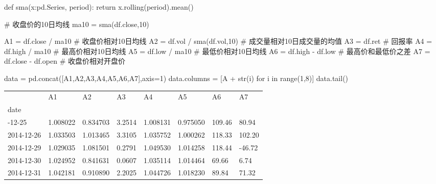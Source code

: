 \documentclass[
  letterpaper,
  DIV=11,
  numbers=noendperiod]{scrreprt}
\newenvironment{Shaded}{\begin{snugshade}}{\end{snugshade}}
\newcommand{\BuiltInTok}[1]{\textcolor[rgb]{0.00,0.23,0.31}{#1}}
\newcommand{\CommentTok}[1]{\textcolor[rgb]{0.37,0.37,0.37}{#1}}
\newcommand{\ControlFlowTok}[1]{\textcolor[rgb]{0.00,0.23,0.31}{#1}}
\newcommand{\DecValTok}[1]{\textcolor[rgb]{0.68,0.00,0.00}{#1}}
\newcommand{\KeywordTok}[1]{\textcolor[rgb]{0.00,0.23,0.31}{#1}}
\newcommand{\NormalTok}[1]{\textcolor[rgb]{0.00,0.23,0.31}{#1}}
\newcommand{\OperatorTok}[1]{\textcolor[rgb]{0.37,0.37,0.37}{#1}}
\newcommand{\StringTok}[1]{\textcolor[rgb]{0.13,0.47,0.30}{#1}}
\begin{document}
\begin{Shaded}
\begin{Highlighting}[]
\KeywordTok{def}\NormalTok{ sma(x:pd.Series, period):}
    \ControlFlowTok{return}\NormalTok{ x.rolling(period).mean()}

\CommentTok{\# 收盘价的10日均线}
\NormalTok{ma10 }\OperatorTok{=}\NormalTok{ sma(df.close,}\DecValTok{10}\NormalTok{) }

\NormalTok{A1 }\OperatorTok{=}\NormalTok{ df.close }\OperatorTok{/}\NormalTok{ ma10 }\CommentTok{\# 收盘价相对10日均线}
\NormalTok{A2 }\OperatorTok{=}\NormalTok{ df.vol }\OperatorTok{/}\NormalTok{ sma(df.vol,}\DecValTok{10}\NormalTok{) }\CommentTok{\# 成交量相对10日成交量的均值}
\NormalTok{A3 }\OperatorTok{=}\NormalTok{ df.ret }\CommentTok{\# 回报率}
\NormalTok{A4 }\OperatorTok{=}\NormalTok{ df.high }\OperatorTok{/}\NormalTok{ ma10 }\CommentTok{\# 最高价相对10日均线}
\NormalTok{A5 }\OperatorTok{=}\NormalTok{ df.low }\OperatorTok{/}\NormalTok{ ma10 }\CommentTok{\# 最低价相对10日均线}
\NormalTok{A6 }\OperatorTok{=}\NormalTok{ df.high }\OperatorTok{{-}}\NormalTok{ df.low }\CommentTok{\# 最高价和最低价之差}
\NormalTok{A7 }\OperatorTok{=}\NormalTok{ df.close }\OperatorTok{{-}}\NormalTok{ df.}\BuiltInTok{open} \CommentTok{\# 收盘价相对开盘价}

\NormalTok{data }\OperatorTok{=}\NormalTok{ pd.concat([A1,A2,A3,A4,A5,A6,A7],axis}\OperatorTok{=}\DecValTok{1}\NormalTok{)}
\NormalTok{data.columns }\OperatorTok{=}\NormalTok{ [}\StringTok{\textquotesingle{}A\textquotesingle{}} \OperatorTok{+} \BuiltInTok{str}\NormalTok{(i) }\ControlFlowTok{for}\NormalTok{ i }\KeywordTok{in} \BuiltInTok{range}\NormalTok{(}\DecValTok{1}\NormalTok{,}\DecValTok{8}\NormalTok{)]}
\NormalTok{data.tail()}
\end{Highlighting}
\end{Shaded}

\begin{longtable}[]{@{}llllllll@{}}
\toprule\noalign{}
& A1 & A2 & A3 & A4 & A5 & A6 & A7 \\
date & & & & & & & \\
\midrule\noalign{}
\endhead
\bottomrule\noalign{}
\endlastfoot
2014-12-25 & 1.008022 & 0.834703 & 3.2514 & 1.008131 & 0.975050 & 109.46
& 80.94 \\
2014-12-26 & 1.033503 & 1.013465 & 3.3105 & 1.035752 & 1.000262 & 118.33
& 102.20 \\
2014-12-29 & 1.029035 & 1.081501 & 0.2791 & 1.049530 & 1.014258 & 118.44
& -46.72 \\
2014-12-30 & 1.024952 & 0.841631 & 0.0607 & 1.035114 & 1.014464 & 69.66
& 6.74 \\
2014-12-31 & 1.042181 & 0.910890 & 2.2025 & 1.044726 & 1.018230 & 89.84
& 71.32 \\
\end{longtable}
\end{document}
